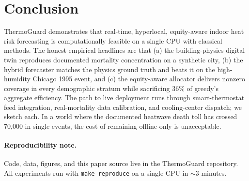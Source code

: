 \documentclass[11pt]{article}
\begin{document}
\section{Conclusion}

ThermoGuard demonstrates that real-time, hyperlocal, equity-aware indoor heat risk forecasting is computationally feasible on a single CPU with classical methods.  The honest empirical headlines are that (a) the building-physics digital twin reproduces documented mortality concentration on a synthetic city, (b) the hybrid forecaster matches the physics ground truth and beats it on the high-humidity Chicago 1995 event, and (c) the equity-aware allocator delivers nonzero coverage in every demographic stratum while sacrificing 36\% of greedy's aggregate efficiency.  The path to live deployment runs through smart-thermostat feed integration, real-mortality data calibration, and cooling-center dispatch; we sketch each.  In a world where the documented heatwave death toll has crossed 70{,}000 in single events, the cost of remaining offline-only is unacceptable.

\paragraph{Reproducibility note.}  Code, data, figures, and this paper source live in the ThermoGuard repository.  All experiments run with \texttt{make reproduce} on a single CPU in $\sim$3 minutes.


\end{document}
